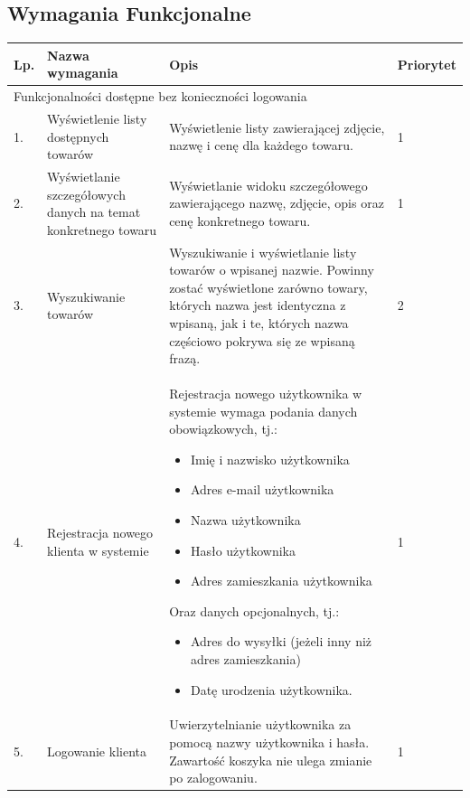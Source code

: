 \documentclass[10pt,a4paper]{article}
\begin{document}
	  \newpage
	  \subsection{Wymagania Funkcjonalne}
	  	\flushleft
          \begin{longtable}{| m{0.5cm} | m{4cm} | p{6cm} | m{1.5cm} |}
            \hline
            Lp. & Nazwa wymagania 						& Opis 										& Priorytet\\ \hline
            \multicolumn{4}{|l|}{Funkcjonalności dostępne bez konieczności logowania}\\ \hline
            1.  & Wyświetlenie listy dostępnych towarów & Wyświetlenie listy zawierającej zdjęcie, 
            											  nazwę i cenę dla każdego towaru.			& 1\\ \hline
            2.  & Wyświetlanie szczegółowych danych na 
            	  temat konkretnego towaru				& Wyświetlanie widoku szczegółowego 
            	  										  zawierającego nazwę, zdjęcie, opis oraz
            	  										  cenę konkretnego towaru.					& 1\\ \hline
			3.  & Wyszukiwanie towarów					& Wyszukiwanie i wyświetlanie listy 
														  towarów o wpisanej nazwie. Powinny zostać 
														  wyświetlone zarówno towary, których nazwa 
														  jest identyczna z wpisaną, jak i te,
														  których nazwa częściowo pokrywa się 
														  ze wpisaną frazą.							& 2\\ \hline
			4.	& Rejestracja nowego klienta w systemie & Rejestracja nowego użytkownika w systemie
														  wymaga podania danych obowiązkowych, tj.:
														  
														  \begin{itemize}[label={--}]
														  \item Imię i nazwisko użytkownika
														  \item Adres e-mail użytkownika
														  \item Nazwa użytkownika
														  \item Hasło użytkownika
														  \item Adres zamieszkania użytkownika
														  \end{itemize}
														  Oraz danych opcjonalnych, tj.:
														  \begin{itemize}[label={--}]
														  \item Adres do wysyłki
														      (jeżeli inny niż adres zamieszkania)
														  \item Datę urodzenia użytkownika.
														  \end{itemize}								& 1\\ \hline
			5. & Logowanie klienta						& Uwierzytelnianie użytkownika za pomocą 
														  nazwy użytkownika i hasła. 
														  Zawartość koszyka nie ulega zmianie 
														  po zalogowaniu.							& 1\\ \hline
														  

\end{longtable}
\end{document}
